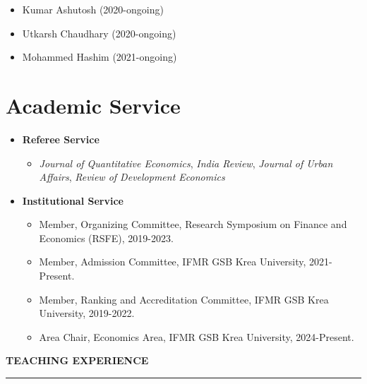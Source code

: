 \documentclass[10pt]{article}
\begin{document}
\begin{itemize}
	\item Kumar Ashutosh (2020-ongoing)
	\item Utkarsh Chaudhary (2020-ongoing)
	\item Mohammed Hashim (2021-ongoing)
\end{itemize}

\clearpage

\section*{Academic Service}

\begin{itemize}
\item[] \textbf{Referee Service}
        \begin{itemize}
        \item[] \textit{Journal of Quantitative Economics}, \textit{India Review}, \textit{Journal of Urban Affairs}, \textit{Review of Development Economics}
        \end{itemize}
\item[] \textbf{Institutional Service}
        \begin{itemize}
        \item[] Member, Organizing Committee, Research Symposium on Finance and Economics (RSFE), 2019-2023.
        \item[] Member, Admission Committee, IFMR GSB Krea University, 2021-Present.
        \item[] Member, Ranking and Accreditation Committee, IFMR GSB Krea University, 2019-2022.
        \item[] Area Chair, Economics Area, IFMR GSB Krea University, 2024-Present.
        \end{itemize}
\end{itemize}


\vspace{6pt}

\begin{large}{\bf TEACHING EXPERIENCE}\end{large}
  \vspace{3pt}
  \hrule
\end{document}
